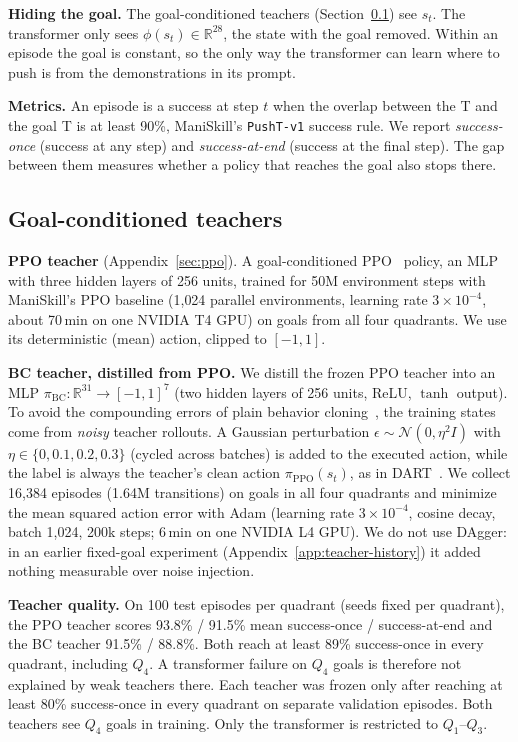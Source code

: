 \textbf{Hiding the goal.} The goal-conditioned teachers (Section~\ref{sec:teachers}) see $s_t$. The transformer only sees
$\phi(s_t) \in \mathbb{R}^{28}$, the state with the goal removed. Within an episode the goal is constant, so the only way the
transformer can learn where to push is from the demonstrations in its prompt.

\textbf{Metrics.} An episode is a success at step $t$ when the overlap between the T and the goal T is at least 90\%, ManiSkill's
\texttt{PushT-v1} success rule.
We report \emph{success-once} (success at any step) and \emph{success-at-end} (success at the final step). The gap between them
measures whether a policy that reaches the goal also stops there.

\subsection{Goal-conditioned teachers}
\label{sec:teachers}

\textbf{PPO teacher} (Appendix~\ref{sec:ppo}). A goal-conditioned PPO~\cite{schulman2017ppo} policy, an MLP with three hidden
layers of 256 units, trained for 50M environment steps with ManiSkill's PPO baseline (1{,}024 parallel environments, learning rate
$3\times10^{-4}$, about 70\,min on one NVIDIA T4 GPU) on goals from all four quadrants. We use its deterministic (mean) action,
clipped to $[-1,1]$.

\textbf{BC teacher, distilled from PPO.} We distill the frozen PPO teacher into an MLP
$\pi_{\mathrm{BC}}: \mathbb{R}^{31} \to [-1,1]^7$ (two hidden layers of 256 units, ReLU, $\tanh$ output). To avoid the compounding
errors of plain behavior cloning~\cite{ross2011dagger}, the training states come from \emph{noisy} teacher rollouts. A Gaussian
perturbation $\epsilon \sim \mathcal{N}(0,\eta^2 I)$ with $\eta \in \{0, 0.1, 0.2, 0.3\}$ (cycled across batches) is added to
the executed action, while the label is always the teacher's clean action $\pi_{\mathrm{PPO}}(s_t)$, as in DART~\cite{laskey2017dart}.
We collect 16{,}384 episodes (1.64M transitions) on goals in all four quadrants and minimize the mean squared action error with Adam
(learning rate $3\times10^{-4}$, cosine decay, batch 1{,}024, 200k steps; 6\,min on one NVIDIA L4 GPU). We do not use DAgger: in an earlier fixed-goal experiment
(Appendix~\ref{app:teacher-history}) it added nothing measurable over noise injection.

\textbf{Teacher quality.} On 100 test episodes per quadrant (seeds fixed per quadrant), the PPO teacher scores 93.8\% / 91.5\% mean
success-once / success-at-end and the BC teacher 91.5\% / 88.8\%. Both reach at least 89\% success-once in every quadrant, including $Q_4$.
A transformer failure on $Q_4$ goals is therefore not explained by weak teachers there. Each teacher was frozen only after
reaching at least 80\% success-once in every quadrant on separate validation episodes.
Both teachers see $Q_4$ goals in training. Only the transformer is restricted to $Q_1$--$Q_3$.

